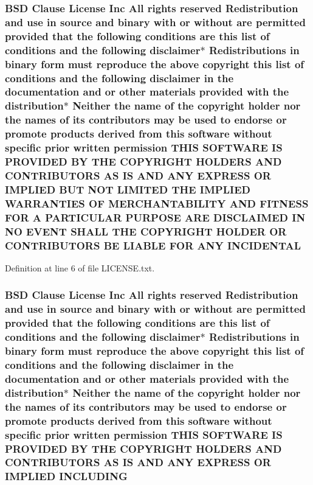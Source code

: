 \subsubsection[{\texorpdfstring{I\+N\+C\+I\+D\+E\+N\+T\+AL}{INCIDENTAL}}]{\setlength{\rightskip}{0pt plus 5cm}B\+SD Clause License Inc All rights reserved Redistribution and use in source and binary with or without are permitted provided that the following conditions are this list of conditions and the following disclaimer$\ast$ Redistributions in binary form must reproduce the above copyright this list of conditions and the following disclaimer in the documentation and or other materials provided with the distribution$\ast$ Neither the name of the copyright holder nor the names of its contributors may be used to endorse or promote products derived from this software without specific prior written permission T\+H\+IS S\+O\+F\+T\+W\+A\+RE IS P\+R\+O\+V\+I\+D\+ED BY T\+HE C\+O\+P\+Y\+R\+I\+G\+HT H\+O\+L\+D\+E\+RS A\+ND C\+O\+N\+T\+R\+I\+B\+U\+T\+O\+RS AS IS A\+ND A\+NY E\+X\+P\+R\+E\+SS OR I\+M\+P\+L\+I\+ED B\+UT N\+OT L\+I\+M\+I\+T\+ED T\+HE I\+M\+P\+L\+I\+ED {\bf W\+A\+R\+R\+A\+N\+T\+I\+ES} OF M\+E\+R\+C\+H\+A\+N\+T\+A\+B\+I\+L\+I\+TY A\+ND F\+I\+T\+N\+E\+SS F\+OR A P\+A\+R\+T\+I\+C\+U\+L\+AR P\+U\+R\+P\+O\+SE A\+RE D\+I\+S\+C\+L\+A\+I\+M\+ED IN NO E\+V\+E\+NT S\+H\+A\+LL T\+HE C\+O\+P\+Y\+R\+I\+G\+HT H\+O\+L\+D\+ER OR C\+O\+N\+T\+R\+I\+B\+U\+T\+O\+RS BE L\+I\+A\+B\+LE F\+OR A\+NY I\+N\+C\+I\+D\+E\+N\+T\+AL}\hypertarget{LICENSE_8txt_a7f76bd8e64b92352ebc9702da9b2286d}{}\label{LICENSE_8txt_a7f76bd8e64b92352ebc9702da9b2286d}


Definition at line 6 of file L\+I\+C\+E\+N\+S\+E.\+txt.

\subsubsection[{\texorpdfstring{I\+N\+C\+L\+U\+D\+I\+NG}{INCLUDING}}]{\setlength{\rightskip}{0pt plus 5cm}B\+SD Clause License Inc All rights reserved Redistribution and use in source and binary with or without are permitted provided that the following conditions are this list of conditions and the following disclaimer$\ast$ Redistributions in binary form must reproduce the above copyright this list of conditions and the following disclaimer in the documentation and or other materials provided with the distribution$\ast$ Neither the name of the copyright holder nor the names of its contributors may be used to endorse or promote products derived from this software without specific prior written permission T\+H\+IS S\+O\+F\+T\+W\+A\+RE IS P\+R\+O\+V\+I\+D\+ED BY T\+HE C\+O\+P\+Y\+R\+I\+G\+HT H\+O\+L\+D\+E\+RS A\+ND C\+O\+N\+T\+R\+I\+B\+U\+T\+O\+RS AS IS A\+ND A\+NY E\+X\+P\+R\+E\+SS OR I\+M\+P\+L\+I\+ED I\+N\+C\+L\+U\+D\+I\+NG}\hypertarget{LICENSE_8txt_aa4b11f541e6ee38e9eb74721057af7f2}{}\label{LICENSE_8txt_aa4b11f541e6ee38e9eb74721057af7f2}


